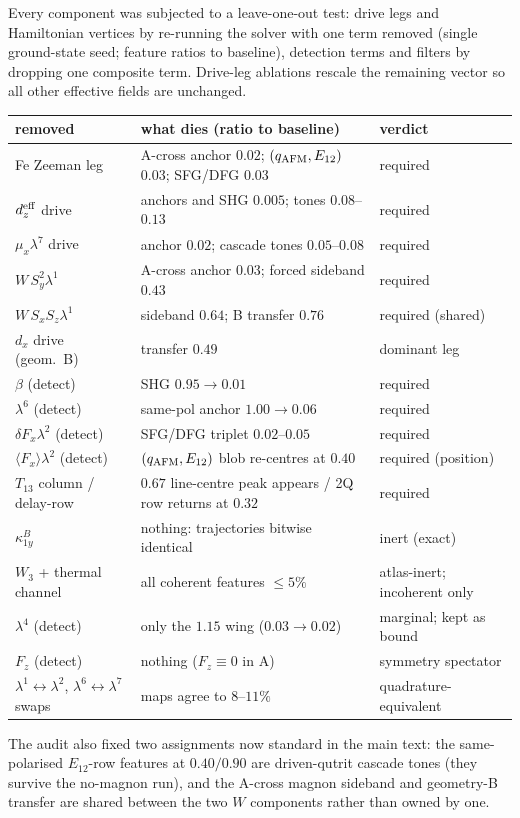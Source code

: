\documentclass[11pt]{article}
\newcommand{\qafm}{q_{\rm AFM}}
\begin{document}
Every component was subjected to a leave-one-out test: drive legs and
Hamiltonian vertices by re-running the solver with one term removed
(single ground-state seed; feature ratios to baseline), detection
terms and filters by dropping one composite term.  Drive-leg
ablations rescale the remaining vector so all other effective fields
are unchanged.
\begin{center}\small
\renewcommand{\arraystretch}{1.2}
\begin{tabular}{lll}
\toprule
removed & what dies (ratio to baseline) & verdict\\
\midrule
Fe Zeeman leg & A-cross anchor $0.02$; $(\qafm,E_{12})$ $0.03$;
  SFG/DFG $0.03$ & required\\
$d_z^{\rm eff}$ drive & anchors and SHG $0.005$; tones
  $0.08$--$0.13$ & required\\
$\mu_x\lambda^7$ drive & anchor $0.02$; cascade tones
  $0.05$--$0.08$ & required\\
$W\,S_y^2\lambda^1$ & A-cross anchor $0.03$; forced sideband
  $0.43$ & required\\
$W\,S_xS_z\lambda^1$ & sideband $0.64$; B transfer $0.76$ &
  required (shared)\\
$d_x$ drive (geom.\ B) & transfer $0.49$ & dominant leg\\
$\beta$ (detect) & SHG $0.95\to0.01$ & required\\
$\lambda^6$ (detect) & same-pol anchor $1.00\to0.06$ & required\\
$\delta F_x\lambda^2$ (detect) & SFG/DFG triplet $0.02$--$0.05$ &
  required\\
$\langle F_x\rangle\lambda^2$ (detect) & $(\qafm,E_{12})$ blob
  re-centres at $0.40$ & required (position)\\
$T_{13}$ column / delay-row & $0.67$ line-centre peak appears /
  2Q row returns at $0.32$ & required\\
$\kappa^B_{1y}$ & nothing: trajectories bitwise identical &
  inert (exact)\\
$W_3$ + thermal channel & all coherent features $\leq5\%$ &
  atlas-inert; incoherent only\\
$\lambda^4$ (detect) & only the $1.15$ wing ($0.03\to0.02$) &
  marginal; kept as bound\\
$F_z$ (detect) & nothing ($F_z\equiv0$ in A) & symmetry spectator\\
$\lambda^1\leftrightarrow\lambda^2$,
  $\lambda^6\leftrightarrow\lambda^7$ swaps & maps agree to
  $8$--$11\%$ & quadrature-equivalent\\
\bottomrule
\end{tabular}
\end{center}
The audit also fixed two assignments now standard in the main text:
the same-polarised $E_{12}$-row features at $0.40/0.90$ are
driven-qutrit cascade tones (they survive the no-magnon run), and the
A-cross magnon sideband and geometry-B transfer are shared between
the two $W$ components rather than owned by one.
\end{document}

